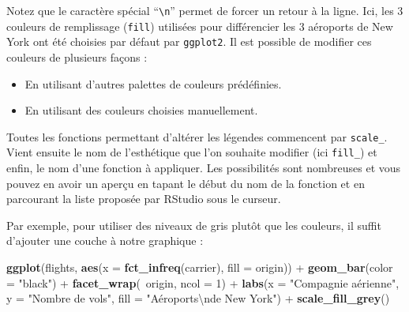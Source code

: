 \documentclass[
  a4paper,
]{article}
\newenvironment{Shaded}{\begin{snugshade}}{\end{snugshade}}
\newcommand{\CharTok}[1]{\textcolor[rgb]{0.57,0.30,0.62}{#1}}
\newcommand{\DataTypeTok}[1]{\textcolor[rgb]{0.00,0.34,0.68}{#1}}
\newcommand{\DecValTok}[1]{\textcolor[rgb]{0.69,0.50,0.00}{#1}}
\newcommand{\KeywordTok}[1]{\textcolor[rgb]{0.12,0.11,0.11}{\textbf{#1}}}
\newcommand{\NormalTok}[1]{\textcolor[rgb]{0.12,0.11,0.11}{#1}}
\newcommand{\OperatorTok}[1]{\textcolor[rgb]{0.12,0.11,0.11}{#1}}
\newcommand{\StringTok}[1]{\textcolor[rgb]{0.75,0.01,0.01}{#1}}
\providecommand{\tightlist}{%
  \setlength{\itemsep}{0pt}\setlength{\parskip}{0pt}}
\begin{document}
Notez que le caractère spécial ``\texttt{\textbackslash{}n}'' permet de forcer un retour à la ligne. Ici, les 3 couleurs de remplissage (\texttt{fill}) utilisées pour différencier les 3 aéroports de New York ont été choisies par défaut par \texttt{ggplot2}. Il est possible de modifier ces couleurs de plusieurs façons :

\begin{itemize}
\tightlist
\item
  En utilisant d'autres palettes de couleurs prédéfinies.
\item
  En utilisant des couleurs choisies manuellement.
\end{itemize}

Toutes les fonctions permettant d'altérer les légendes commencent par \texttt{scale\_}. Vient ensuite le nom de l'esthétique que l'on souhaite modifier (ici \texttt{fill\_}) et enfin, le nom d'une fonction à appliquer. Les possibilités sont nombreuses et vous pouvez en avoir un aperçu en tapant le début du nom de la fonction et en parcourant la liste proposée par RStudio sous le curseur.

Par exemple, pour utiliser des niveaux de gris plutôt que les couleurs, il suffit d'ajouter une couche à notre graphique :

\begin{Shaded}
\begin{Highlighting}[]
\KeywordTok{ggplot}\NormalTok{(flights, }\KeywordTok{aes}\NormalTok{(}\DataTypeTok{x =} \KeywordTok{fct_infreq}\NormalTok{(carrier), }\DataTypeTok{fill =}\NormalTok{ origin)) }\OperatorTok{+}
\StringTok{  }\KeywordTok{geom_bar}\NormalTok{(}\DataTypeTok{color =} \StringTok{"black"}\NormalTok{) }\OperatorTok{+}
\StringTok{  }\KeywordTok{facet_wrap}\NormalTok{(}\OperatorTok{~}\NormalTok{origin, }\DataTypeTok{ncol =} \DecValTok{1}\NormalTok{) }\OperatorTok{+}
\StringTok{  }\KeywordTok{labs}\NormalTok{(}\DataTypeTok{x =} \StringTok{"Compagnie aérienne"}\NormalTok{,}
       \DataTypeTok{y =} \StringTok{"Nombre de vols"}\NormalTok{,}
       \DataTypeTok{fill =} \StringTok{"Aéroports}\CharTok{\textbackslash{}n}\StringTok{de New York"}\NormalTok{) }\OperatorTok{+}
\StringTok{  }\KeywordTok{scale_fill_grey}\NormalTok{()}
\end{Highlighting}
\end{Shaded}
\end{document}
